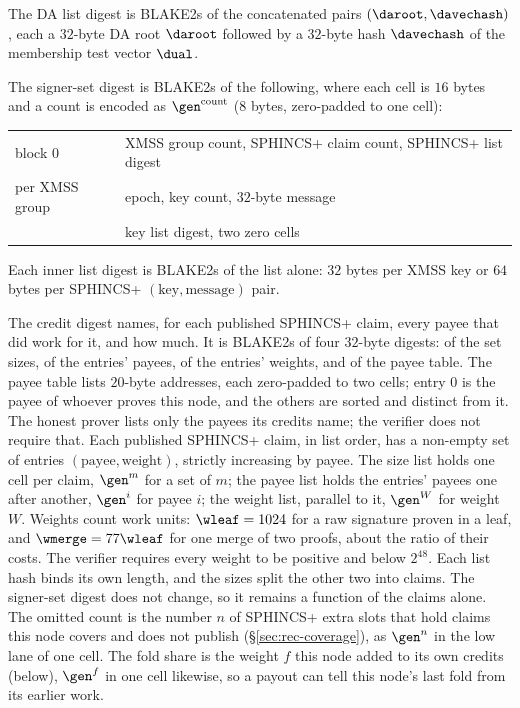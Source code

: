 The DA list digest is BLAKE2s of the concatenated pairs $(\daroot,\davechash)$, each a $32$-byte DA root $\daroot$ followed by a $32$-byte hash $\davechash$ of the membership test vector $\dual$.

The signer-set digest is BLAKE2s of the following, where each cell is $16$ bytes and a count is encoded as $\gen^{\text{count}}$ (8 bytes, zero-padded to one cell):
\begin{center}
\begin{tabular}{@{}ll@{}}
\hline
block $0$ & XMSS group count, SPHINCS+ claim count, SPHINCS+ list digest\\
per XMSS group & epoch, key count, $32$-byte message\\
& key list digest, two zero cells\\
\hline
\end{tabular}
\end{center}
Each inner list digest is BLAKE2s of the list alone: $32$ bytes per XMSS key or $64$ bytes per SPHINCS+ $(\text{key},\text{message})$ pair.

The credit digest names, for each published SPHINCS+ claim, every payee that did work for it, and how much. It is BLAKE2s of four $32$-byte digests: of the set sizes, of the entries' payees, of the entries' weights, and of the payee table. The payee table lists $20$-byte addresses, each zero-padded to two cells; entry $0$ is the payee of whoever proves this node, and the others are sorted and distinct from it. The honest prover lists only the payees its credits name; the verifier does not require that. Each published SPHINCS+ claim, in list order, has a non-empty set of entries $(\text{payee}, \text{weight})$, strictly increasing by payee. The size list holds one cell per claim, $\gen^m$ for a set of $m$; the payee list holds the entries' payees one after another, $\gen^i$ for payee $i$; the weight list, parallel to it, $\gen^W$ for weight $W$. Weights count work units: $\wleaf = 1024$ for a raw signature proven in a leaf, and $\wmerge = 77\wleaf$ for one merge of two proofs, about the ratio of their costs. The verifier requires every weight to be positive and below $2^{48}$. Each list hash binds its own length, and the sizes split the other two into claims. The signer-set digest does not change, so it remains a function of the claims alone. The omitted count is the number $n$ of SPHINCS+ extra slots that hold claims this node covers and does not publish (\S\ref{sec:rec-coverage}), as $\gen^n$ in the low lane of one cell. The fold share is the weight $f$ this node added to its own credits (below), $\gen^f$ in one cell likewise, so a payout can tell this node's last fold from its earlier work.

